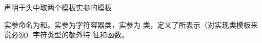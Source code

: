 声明于头中取两个模板实参的模板

\begin{note}[\noindent]
实参命名为和。实参为字符容器类，实参为
类，定义了所表示（对实现类模板来说必须）字符类型的额外特
征和函数。
\end{note}
